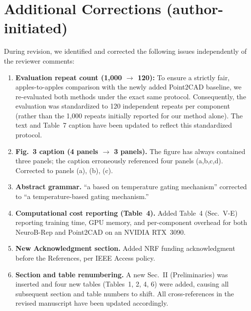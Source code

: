 \documentclass[11pt]{article}
\begin{document}
\section*{Additional Corrections (author-initiated)}

During revision, we identified and corrected the following issues
independently of the reviewer comments:

\begin{enumerate}[leftmargin=*, label=\textbf{\arabic*.}]
  \item \textbf{Evaluation repeat count (1{,}000 $\rightarrow$ 120):}
        To ensure a strictly fair, apples-to-apples comparison with the 
        newly added Point2CAD baseline, we re-evaluated both methods under 
        the exact same protocol. Consequently, the evaluation was standardized 
        to 120 independent repeats per component (rather than the 1,000 repeats 
        initially reported for our method alone). The text and Table~7 caption 
        have been updated to reflect this standardized protocol.

  \item \textbf{Fig.~3 caption (4 panels $\rightarrow$ 3 panels).}
        The figure has always contained three panels; the caption
        erroneously referenced four panels (a,b,c,d).
        Corrected to panels (a), (b), (c).

  \item \textbf{Abstract grammar.}
        ``a based on temperature gating mechanism'' corrected to
        ``a temperature-based gating mechanism.''

  \item \textbf{Computational cost reporting (Table~4).}
        Added Table~4 (Sec.~V-E) reporting training time, GPU memory,
        and per-component overhead for both NeuroB-Rep and Point2CAD
        on an NVIDIA RTX~3090.

  \item \textbf{New Acknowledgment section.}
        Added NRF funding acknowledgment before the References,
        per IEEE Access policy.

  \item \textbf{Section and table renumbering.}
        A new Sec.~II (Preliminaries) was inserted and four new tables
        (Tables~1, 2, 4, 6) were added, causing all subsequent section
        and table numbers to shift.
        All cross-references in the revised manuscript have been updated
        accordingly.
\end{enumerate}
\end{document}
